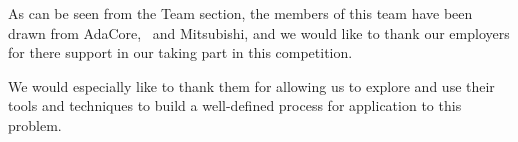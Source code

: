 \label{Acknowledgments}
As can be seen from the Team section, the members of this team have
been drawn from AdaCore, \altran\ and Mitsubishi, and we would like to
thank our employers for there support in our taking part in this
competition.

We would especially like to thank them for allowing us to explore and
use their tools and techniques to build a well-defined process for
application to this problem.

